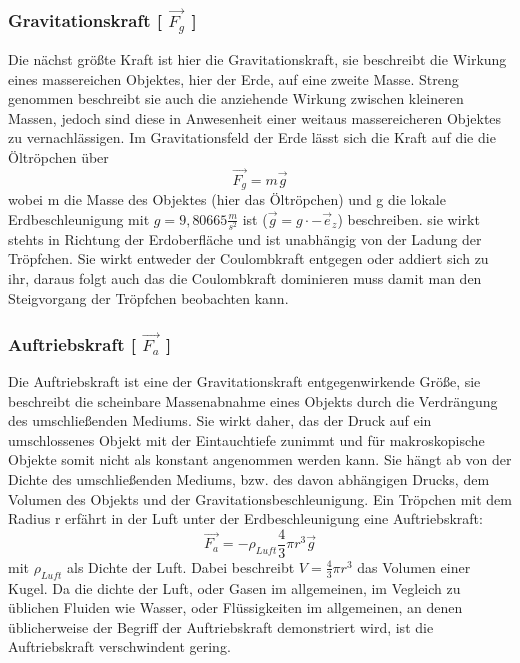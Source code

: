 \documentclass{scrartcl}
\begin{document}
			\subsubsection{Gravitationskraft [ $\vec{F_g}$ ]}
			Die nächst größte Kraft ist hier die Gravitationskraft, sie beschreibt die Wirkung eines massereichen Objektes,
			hier der Erde, auf eine zweite Masse. Streng genommen beschreibt sie auch die anziehende Wirkung zwischen kleineren
			Massen, jedoch sind diese in Anwesenheit einer weitaus massereicheren Objektes zu vernachlässigen.
			Im Gravitationsfeld der Erde lässt sich die Kraft auf die die Öltröpchen über
			\begin{equation} 
				\vec{F_g} = m\vec{g}
			\end{equation}
			wobei m die Masse des Objektes (hier das Öltröpchen) und g die lokale Erdbeschleunigung mit $g = 9,80665 \frac{m}{s^2}$ ist ($\vec{g} = g \cdot -\vec{e}_z$) beschreiben.
			sie wirkt stehts in Richtung der Erdoberfläche und ist unabhängig von der Ladung der Tröpfchen. Sie wirkt entweder
			der Coulombkraft entgegen oder addiert sich zu ihr, daraus folgt auch das die Coulombkraft dominieren muss damit man den
			Steigvorgang der Tröpfchen beobachten kann.
		
			\subsubsection{Auftriebskraft [ $\vec{F_a}$ ]}
			Die Auftriebskraft ist eine der Gravitationskraft entgegenwirkende Größe, sie beschreibt die scheinbare
			Massenabnahme eines Objekts durch die Verdrängung des umschließenden Mediums. Sie wirkt daher, das der
			Druck auf ein umschlossenes Objekt mit der Eintauchtiefe zunimmt und für makroskopische Objekte somit
			nicht als konstant angenommen werden kann. Sie hängt ab von der Dichte des umschließenden Mediums, bzw. des davon abhängigen Drucks,
			dem Volumen des Objekts und der Gravitationsbeschleunigung.
			Ein Tröpchen mit dem Radius r erfährt in der Luft unter der Erdbeschleunigung eine Auftriebskraft:
			\begin{equation}
				\vec{F_a} = - \rho_{Luft} \frac{4}{3} \pi r^3 \vec{g}
			\end{equation}
			mit $\rho_{Luft}$ als Dichte der Luft. Dabei beschreibt $V=\frac{4}{3} \pi r^3$ das Volumen einer Kugel.
			Da die dichte der Luft, oder Gasen im allgemeinen, im Vegleich zu üblichen Fluiden wie Wasser, oder Flüssigkeiten im allgemeinen, an denen üblicherweise
			der Begriff der Auftriebskraft demonstriert wird, ist die Auftriebskraft verschwindent gering.
		
\end{document}
